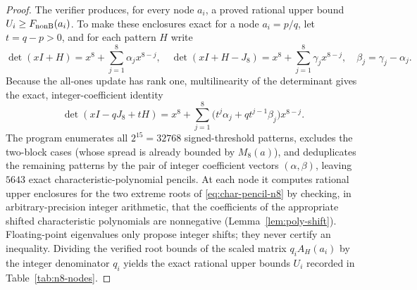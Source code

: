 \documentclass[11pt,reqno]{article}
\theoremstyle{definition}
\begin{document}
\begin{proof}
The verifier produces, for every node $a_i$, a proved rational upper bound
$U_i\ge F_{\rm nonB}(a_i)$. To make these enclosures exact for a node
$a_i=p/q$, let $t=q-p>0$, and for each pattern $H$ write
\[
\det(xI+H)=x^8+\sum_{j=1}^8\alpha_j x^{8-j},\quad
\det(xI+H-J_8)=x^8+\sum_{j=1}^8\gamma_j x^{8-j},\quad
\beta_j=\gamma_j-\alpha_j.
\]
Because the all-ones update has rank one, multilinearity of the determinant
gives the exact, integer-coefficient identity
\begin{equation}\label{eq:char-pencil-n8}
\det(xI-qJ_8+tH)=x^8+\sum_{j=1}^8
\bigl(t^j\alpha_j+q t^{j-1}\beta_j\bigr)x^{8-j}.
\end{equation}
The program enumerates all $2^{15}=32768$ signed-threshold patterns,
excludes the two-block cases (whose spread is already bounded by $M_8(a)$),
and deduplicates the remaining patterns by the pair of integer coefficient
vectors $(\alpha,\beta)$, leaving $5643$ exact characteristic-polynomial pencils.
At each node it computes rational upper enclosures for the two extreme roots
of \eqref{eq:char-pencil-n8} by checking, in arbitrary-precision integer
arithmetic, that the coefficients of the appropriate shifted characteristic
polynomials are nonnegative (Lemma~\ref{lem:poly-shift}). Floating-point
eigenvalues only propose integer shifts; they never certify an inequality.
Dividing the verified root bounds of the scaled matrix $q_i A_H(a_i)$ by the integer denominator $q_i$ yields the exact rational upper bounds $U_i$ recorded in Table~\ref{tab:n8-nodes}.


\end{proof}
\end{document}

